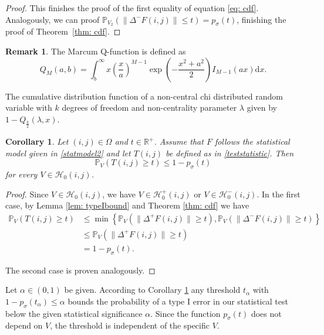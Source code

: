 \documentclass[a4paper,12pt]{article}
\newcommand{\norm}[1]{\lVert#1\rVert}
\theoremstyle{plain}
\newtheorem{corollary}[theorem]{Corollary}
\theoremstyle{definition}
\newtheorem{remark}[theorem]{Remark}
\begin{document}
\begin{proof}
	This finishes the proof of the first equality of equation \eqref{eq: cdf}. Analogously, we can proof $\mathbb{P}_{V_2}( \norm{\Delta^- F(i, j)} \leq t ) = p_\sigma(t)$, finishing the proof of Theorem~\ref{thm: cdf}.
\end{proof}

\begin{remark}
	The Marcum Q-function is defined as
	\begin{equation*}
		Q_M(a, b) = \int_b^\infty x \left( \frac{x}{a} \right)^{M-1} \exp \left( -\frac{x^2 + a^2}{2} \right) I_{M-1}(a x) \mathrm{d}x.
	\end{equation*}
	
	The cumulative distribution function of a non-central chi distributed random variable with $k$ degrees of freedom and non-centrality parameter $\lambda$ given by $1 - Q_\frac{k}{2}(\lambda, x)$.
\end{remark}

\begin{corollary}\label{cor: typeIbound}
	Let $(i, j) \in \Omega$ and $t \in \mathbb{R}^+$. Assume that $F$ follows the statistical model given in \eqref{statmodel2} and let $T(i, j)$ be defined as in \eqref{teststatistic}. Then
	\begin{equation}
		\mathbb{P}_V( T(i, j) \geq t ) \leq 1 - p_\sigma(t)
	\end{equation}
	for every $V \in \mathcal{H}_0(i, j)$.
\end{corollary}
\begin{proof}
	Since $V \in \mathcal{H}_0(i, j)$, we have $V \in \mathcal{H}_0^+(i, j)$ or $V \in \mathcal{H}_0^-(i, j)$. In the first case, by Lemma \ref{lem: typeIbound} and Theorem \ref{thm: cdf} we have
	\begin{align*}
		\mathbb{P}_V( T(i, j) \geq t ) &\leq \min \left\{ \mathbb{P}_V( \norm{\Delta^+ F(i, j)} \geq t ), \mathbb{P}_V( \norm{\Delta^- F(i, j)} \geq t ) \right\} \\
		&\leq \mathbb{P}_V( \norm{\Delta^+ F(i, j)} \geq t ) \\
		&= 1 - p_\sigma(t).
	\end{align*}
	
	The second case is proven analogously.
\end{proof}

Let $\alpha \in (0, 1)$ be given. According to Corollary \ref{cor: typeIbound} any threshold $t_\alpha$ with $1 - p_\sigma(t_\alpha) \leq \alpha$ bounds the probability of a type I error in our statistical test below the given statistical significance $\alpha$. Since the function $p_\sigma(t)$ does not depend on $V$, the threshold is independent of the specific $V$.
\end{document}
